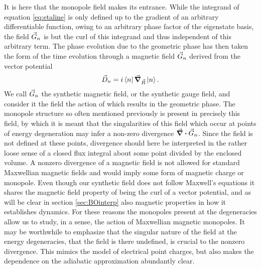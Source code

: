 \documentclass[main.tex]{subfiles}
\begin{document}
It is here that the monopole field makes its entrance. While the integrand of equation
\ref{eq:etaline} is only defined up to the gradient of an arbitrary differentiable function, owing to an arbitrary phase factor of
the eigenstate basis, the field \(\vec{G}_n\) is but the curl of this integrand and thus
independent of this arbitrary term. The phase evolution due to the geometric phase has
then taken the form of the time evolution through a magnetic field \(\vec{G}_n\) derived
from the vector potential
\begin{align}\label{eq:Dfield}
        \vec{D}_n = i\bra{n}\grad_{\vec{R}}\ket{n}
.\end{align}
We call \(\vec{G}_n\) the synthetic magnetic field, or the synthetic gauge field, and consider
it the field the action of which results in the geometric phase. The monopole
structure so often mentioned previously is present in precisely this field, by which it is
meant that the singularities of this field which occur at points of energy degeneration may
infer a non-zero divergence \(\div \vec{G}_n\). Since the field is not defined at these points, divergence
should here be interpreted in the rather loose sense of a closed flux integral about some
point divided by the enclosed volume. A nonzero divergence of a magnetic field is not allowed for
standard Maxwellian magnetic fields and would imply some form of magnetic charge or
monopole. Even though our synthetic field does not follow Maxwell's equations it shares
the magnetic field property of being the curl of a vector potential, and as will be clear
in section \ref{sec:BOinterp} also magnetic properties in how it establishes dynamics. For
these reasons the monopoles present at the degeneracies allow us to study, in a sense, the
action of Maxwellian magnetic monopoles. It may be worthwhile to emphasize that the
singular nature of the field at the energy degeneracies, that the field is there undefined,
is crucial to the nonzero divergence. This mimics the model of electrical point charges,
but also makes the dependence on the adiabatic approximation abundantly clear.
\end{document}
